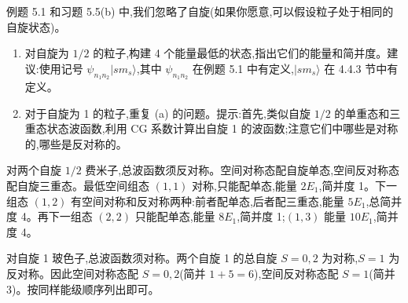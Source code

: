 \begin{question}
例题 5.1 和习题 5.5(b) 中,我们忽略了自旋(如果你愿意,可以假设粒子处于相同的自旋状态)。
\begin{enumerate}
\item 对自旋为 $1/2$ 的粒子,构建 4 个能量最低的状态,指出它们的能量和简并度。建议:使用记号 $\psi_{n_1n_2}|s m_s\rangle$,其中 $\psi_{n_1n_2}$ 在例题 5.1 中有定义,$|s m_s\rangle$ 在 4.4.3 节中有定义。
\item 对于自旋为 1 的粒子,重复 (a) 的问题。提示:首先,类似自旋 $1/2$ 的单重态和三重态状态波函数,利用 CG 系数计算出自旋 1 的波函数;注意它们中哪些是对称的,哪些是反对称的。
\end{enumerate}
\begin{solution}

对两个自旋 $1/2$ 费米子,总波函数须反对称。空间对称态配自旋单态,空间反对称态配自旋三重态。最低空间组态 $(1,1)$ 对称,只能配单态,能量 $2E_1$,简并度 1。下一组态 $(1,2)$ 有空间对称和反对称两种:前者配单态,后者配三重态,能量 $5E_1$,总简并度 4。再下一组态 $(2,2)$ 只能配单态,能量 $8E_1$,简并度 1;$(1,3)$ 能量 $10E_1$,简并度 4。

对自旋 1 玻色子,总波函数须对称。两个自旋 1 的总自旋 $S=0,2$ 为对称,$S=1$ 为反对称。因此空间对称态配 $S=0,2$(简并 $1+5=6$),空间反对称态配 $S=1$(简并 3)。按同样能级顺序列出即可。

\end{solution}
\end{question}

